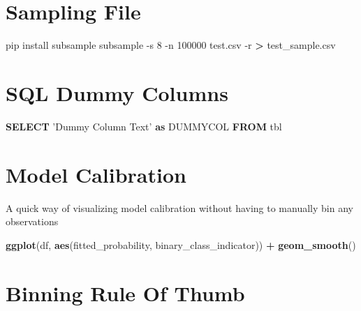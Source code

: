 \documentclass[]{book}
\newenvironment{Shaded}{\begin{snugshade}}{\end{snugshade}}
\newcommand{\KeywordTok}[1]{\textcolor[rgb]{0.13,0.29,0.53}{\textbf{#1}}}
\newcommand{\DataTypeTok}[1]{\textcolor[rgb]{0.13,0.29,0.53}{#1}}
\newcommand{\DecValTok}[1]{\textcolor[rgb]{0.00,0.00,0.81}{#1}}
\newcommand{\StringTok}[1]{\textcolor[rgb]{0.31,0.60,0.02}{#1}}
\newcommand{\CommentTok}[1]{\textcolor[rgb]{0.56,0.35,0.01}{\textit{#1}}}
\newcommand{\OperatorTok}[1]{\textcolor[rgb]{0.81,0.36,0.00}{\textbf{#1}}}
\newcommand{\ExtensionTok}[1]{#1}
\newcommand{\NormalTok}[1]{#1}
\begin{document}
\section{Sampling File}\label{sampling-file}

\begin{Shaded}
\begin{Highlighting}[]
\ExtensionTok{pip}\NormalTok{ install subsample}
\ExtensionTok{subsample}\NormalTok{ -s 8 -n 100000 test.csv -r }\OperatorTok{>}\NormalTok{ test_sample.csv}
\end{Highlighting}
\end{Shaded}

\section{SQL Dummy Columns}\label{sql-dummy-columns}

\begin{Shaded}
\begin{Highlighting}[]
\KeywordTok{SELECT} \StringTok{'Dummy Column Text'} \KeywordTok{as}\NormalTok{ DUMMYCOL }\KeywordTok{FROM}\NormalTok{ tbl}
\end{Highlighting}
\end{Shaded}

\section{Model Calibration}\label{model-calibration}

A quick way of visualizing model calibration without having to manually
bin any observations

\begin{Shaded}
\begin{Highlighting}[]
\KeywordTok{ggplot}\NormalTok{(df, }\KeywordTok{aes}\NormalTok{(fitted_probability, binary_class_indicator)) }\OperatorTok{+}\StringTok{ }\KeywordTok{geom_smooth}\NormalTok{()}
\end{Highlighting}
\end{Shaded}

\section{Binning Rule Of Thumb}\label{binning-rule-of-thumb}

\begin{Shaded}
\end{Shaded}
\end{document}
